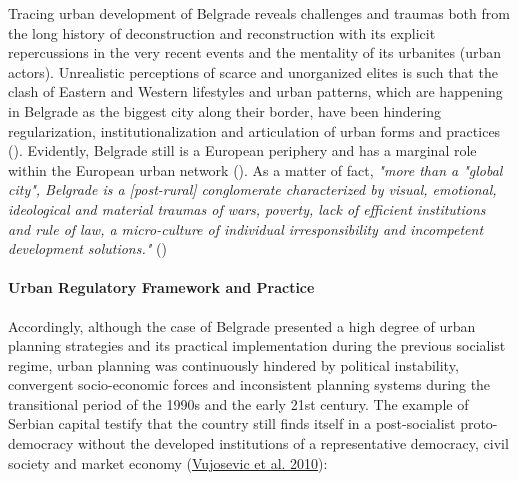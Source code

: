 \documentclass[11pt]{report}
\begin{document}
Tracing  urban  development  of  Belgrade  reveals  challenges  and  traumas both from the long history of deconstruction and reconstruction with its explicit repercussions in the very recent events and the mentality of its urbanites (urban actors).
Unrealistic perceptions of scarce and unorganized elites is such that the clash of Eastern and Western lifestyles and urban patterns, which are  happening in Belgrade as the biggest city along their border, have been hindering regularization, institutionalization and articulation of urban forms and practices (\cite{other ref Samardzic in Doytchinov 2015}).
Evidently, Belgrade still is a European periphery and has a marginal role within the European urban network (\href{}{\citealt{vujovic_belgrades_2007}}). 
As a matter of fact, \textit{"more  than  a  "global  city",  Belgrade  is  a  [post-rural]  conglomerate characterized by visual, emotional, ideological and material traumas of wars, poverty, lack of efficient institutions and rule of law, a micro-culture of  individual  irresponsibility  and  incompetent  development  solutions."} (\href{}{\citealt{doytchinov_belgrade_2015}}) 
\\

\paragraph{Urban Regulatory Framework and Practice}

Accordingly, although the case of Belgrade presented a high degree of urban planning strategies and its practical implementation during the previous socialist regime, urban planning was continuously hindered by political instability, convergent socio-economic forces and inconsistent planning systems during the transitional period of the 1990s and the early 21st century. 
The example of Serbian capital testify that the country still finds itself in a post-socialist proto-democracy without the developed institutions of a representative democracy, civil society and market economy (\href{}{Vujosevic et al. 2010}):
 
\end{document}
